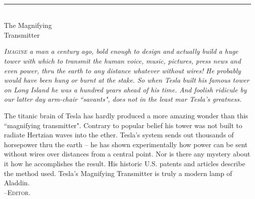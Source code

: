 \documentclass[a4paper,12pt,english,twoside,openright]{memoir}
\begin{document}
\cleardoublepage
\thispagestyle{empty}
\vspace*{5em}
\begin{center}
	\bfseries
	\\
	\noindent\rule{.5\linewidth}{1pt}\\
	\medskip
	{\noindent\LARGE The Magnifying\\Transmitter}
	
	\bigskip
	
	{\normalfont\smallskip\footnotesize\protect\parbox{.75\linewidth}{\itshape
			\lettrine[lines=2]{I}{magine} a man a century ago, bold enough to design and actually build a huge tower with which to transmit the human voice, music, pictures, press news and even power, thru the earth to any distance whatever without wires! He probably would have been hung or burnt at the stake. So when Tesla built his famous tower on Long Island he was a hundred years ahead of his time. And foolish ridicule by our latter day arm-chair ``savants", does not in the least mar Tesla's greatness.
			
			The titanic brain of Tesla has hardly produced a more amazing wonder than this ``magnifying transmitter". Contrary to popular belief his tower was not built to radiate Hertzian waves into the ether. Tesla's system sends out thousands of horsepower thru the earth -- he has shown experimentally how power can be sent without wires over distances from a central point. Nor is there any mystery about it how he accomplishes the result. His historic U.S. patents and articles describe the method used. Tesla's Magnifying Transmitter is truly a modern lamp of Aladdin.	\\
			
			\hfill --\scshape{Editor}.
		}
		\par
	}
	\vspace*{5em}
\end{center}

\end{document}
